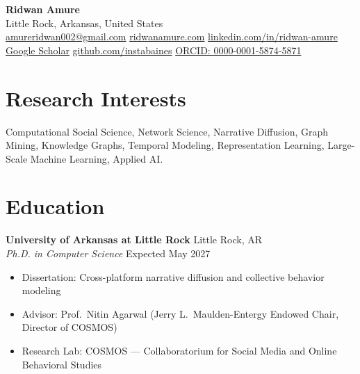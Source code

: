 \documentclass[11pt, letterpaper]{article}
\newcommand{\cvheading}[2]{%
  \noindent\textbf{#1} \hfill \textcolor{mutedgray}{\small #2}%
}
\newcommand{\cvsub}[2]{%
  \noindent\textit{#1} \hfill \textcolor{mutedgray}{\small #2}%
}
\begin{document}
\pagestyle{empty}

\begin{center}
  {\LARGE\bfseries Ridwan Amure}\\[6pt]
  {\color{mutedgray}
    Little Rock, Arkansas, United States\\[3pt]
    \href{mailto:amureridwan002@gmail.com}{amureridwan002@gmail.com}
    \enspace\textbar\enspace
    \href{https://ridwanamure.com}{ridwanamure.com}
    \enspace\textbar\enspace
    \href{https://linkedin.com/in/ridwan-amure}{linkedin.com/in/ridwan-amure}\\[2pt]
    \href{https://scholar.google.com/citations?user=pbfF8dQAAAAJ}{Google Scholar}
    \enspace\textbar\enspace
    \href{https://github.com/instabaines}{github.com/instabaines}
    \enspace\textbar\enspace
    \href{https://orcid.org/0000-0001-5874-5871}{ORCID: 0000-0001-5874-5871}
  }
\end{center}

\vspace{4pt}

\section{Research Interests}

Computational Social Science, Network Science, Narrative Diffusion, Graph Mining, Knowledge Graphs, Temporal Modeling, Representation Learning, Large-Scale Machine Learning, Applied AI.

\section{Education}

\cvheading{University of Arkansas at Little Rock}{Little Rock, AR}\\
\cvsub{Ph.D. in Computer Science}{Expected May 2027}
\begin{itemize}
  \item Dissertation: Cross-platform narrative diffusion and collective behavior modeling
  \item Advisor: Prof.\ Nitin Agarwal (Jerry L.\ Maulden-Entergy Endowed Chair, Director of COSMOS)
  \item Research Lab: COSMOS — Collaboratorium for Social Media and Online Behavioral Studies
\end{itemize}
\end{document}
